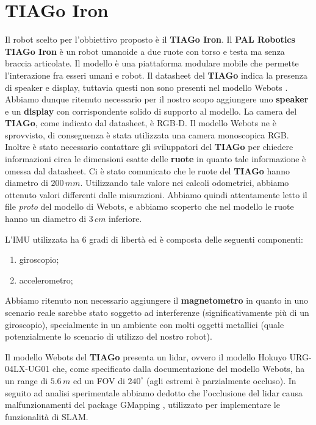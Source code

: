\documentclass[a4paper]{article}
\begin{document}
	\section{TIAGo Iron}\label{sec:TIAGo-Iron} 
	Il robot scelto per l'obbiettivo proposto è il \textbf{TIAGo Iron}. \newline Il \textbf{PAL Robotics TIAGo Iron} \cite{pages2016tiago} è un robot umanoide a due ruote con torso e testa ma senza braccia articolate. Il modello è una piattaforma modulare mobile che permette l'interazione fra esseri umani e robot. \newline
	Il datasheet del \textbf{TIAGo} \cite{tiago_datasheet} indica la presenza di speaker e display, tuttavia questi non sono presenti nel modello Webots \cite{tiagoiron}. Abbiamo dunque ritenuto necessario per il nostro scopo aggiungere uno \textbf{speaker} e un \textbf{display} con corrispondente solido di supporto al modello.
	La camera del \textbf{TIAGo}, come indicato dal datasheet, è RGB-D. Il modello Webots ne è sprovvisto, di conseguenza è stata utilizzata una camera monoscopica RGB.
	Inoltre è stato necessario contattare gli sviluppatori del \textbf{TIAGo} per chiedere informazioni circa le dimensioni esatte delle \textbf{ruote} in quanto tale informazione è omessa dal datasheet. Ci è stato comunicato che le ruote del \textbf{TIAGo} hanno diametro di $200\,mm$. Utilizzando tale valore nei calcoli odometrici, abbiamo ottenuto valori differenti dalle misurazioni. Abbiamo quindi attentamente letto il file \textit{proto} del modello di Webots, e abbiamo scoperto che nel modello le ruote hanno un diametro di $3\,cm$ inferiore. 
	
    L'IMU utilizzata ha 6 gradi di libertà ed è composta delle seguenti componenti:
	\begin{enumerate}
		\item giroscopio;	
		\item accelerometro;
	\end{enumerate}
	Abbiamo ritenuto non necessario aggiungere il \textbf{magnetometro} in quanto in uno scenario reale sarebbe stato soggetto ad interferenze (significativamente più di un giroscopio), specialmente in un ambiente con molti oggetti metallici (quale potenzialmente lo scenario di utilizzo del nostro robot).
	
	Il modello Webots del \textbf{TIAGo} presenta un lidar, ovvero il modello Hokuyo URG-04LX-UG01 \cite{lidarspecs} che, come specificato dalla documentazione del modello Webots,  ha un range di $5.6\,m$ ed un FOV di $240^{\circ}$ (agli estremi è parzialmente occluso). In seguito ad analisi sperimentale abbiamo dedotto che l'occlusione del lidar causa malfunzionamenti del package GMapping \cite{grisettiyz2005improving}, utilizzato per implementare le funzionalità di SLAM.
\end{document}
